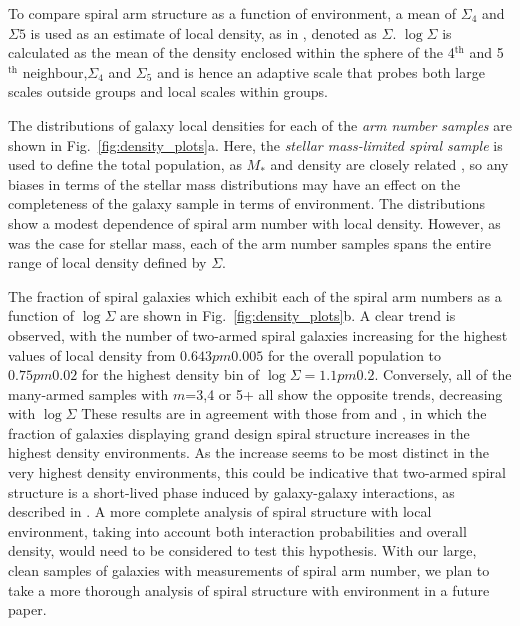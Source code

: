 \documentclass[useAMS,usenatbib]{mn2e}
\begin{document}
To compare spiral arm structure as a function of environment, a mean of $\Sigma_4$ and $\Sigma5$ is used as an estimate of local density, as in \citet{Baldry_06,Bamford_09}, denoted as $\Sigma$. $\log\Sigma$ is calculated as the mean of the density enclosed within the sphere of the 4$^\mathrm{th}$ and 5$^\mathrm{th}$ neighbour,$\Sigma_{\mathrm{4}}$ and $\Sigma_{\mathrm{5}}$ and is hence an adaptive scale that probes both large scales outside groups and local scales within groups. 

The distributions of galaxy local densities for each of the \textit{arm number samples} are shown in Fig.~\ref{fig:density_plots}a. Here, the \textit{stellar mass-limited spiral sample} is used to define the total population, as $M_*$ and density are closely related \citep{Baldry_06}, so any biases in terms of the stellar mass distributions may have an effect on the completeness of the galaxy sample in terms of environment. The distributions show a modest dependence of spiral arm number with local density. However, as was the case for stellar mass, each of the arm number samples spans the entire range of local density defined by $\Sigma$. 

The fraction of spiral galaxies which exhibit each of the spiral arm numbers  as a function of $\log \Sigma$ are shown in Fig.~\ref{fig:density_plots}b. A clear trend  is observed, with the number of two-armed spiral galaxies increasing for the highest values of local density from $0.643 pm 0.005$ for the overall population to $0.75 pm 0.02$ for the highest density bin of $\log \Sigma = 1.1 pm 0.2$. Conversely, all of the many-armed samples with $m$=3,4 or 5+ all show the opposite trends, decreasing with $\log\Sigma$ These results are in agreement with those from \citet{EE_82} and \citet{Ann_14}, in which the fraction of galaxies displaying grand design spiral structure increases in the highest density environments. As the increase seems to be most distinct in the very highest density environments, this could be indicative that two-armed spiral structure is a  short-lived phase induced by galaxy-galaxy interactions, as described in \citet{EE_86}. A more complete analysis of spiral structure with local environment, taking into account both interaction probabilities and overall density, would need to be considered to test this hypothesis. With our large, clean samples of galaxies with measurements of spiral arm number, we plan to take a more thorough analysis of spiral structure with environment in a future paper.

\end{document}
